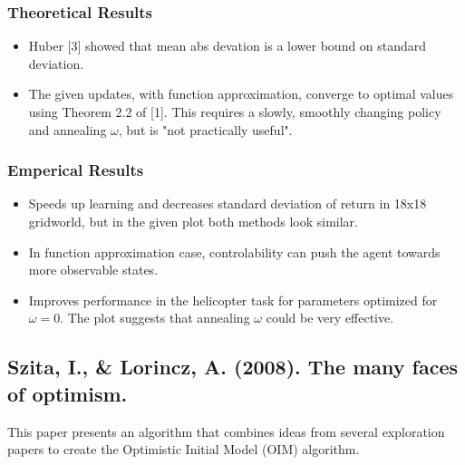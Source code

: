 \documentclass[12pt, oneside]{amsart}
\begin{document}
\subsubsection*{Theoretical Results}
\begin{itemize}
	\item Huber [3] showed that mean abs devation is a lower bound on standard deviation. 
	\item The given updates, with function approximation, converge to optimal values using Theorem 2.2 of [1]. This requires a slowly, smoothly changing policy and annealing $\omega$, but is "not practically useful".
\end{itemize}

\subsubsection*{Emperical Results} 
\begin{itemize}
	\item Speeds up learning and decreases standard deviation of return in 18x18 gridworld, but in the given plot both methods look similar.
	\item In function approximation case, controlability can push the agent towards more observable states. 
	\item Improves performance in the helicopter task for parameters optimized for $\omega=0$. The plot suggests that annealing $\omega$ could be very effective. 
\end{itemize}

\subsection*{Szita, I., \& Lorincz, A. (2008). The many faces of optimism.}
This paper presents an algorithm that combines ideas from several exploration papers to create the Optimistic Initial Model (OIM) algorithm.
\end{document}
